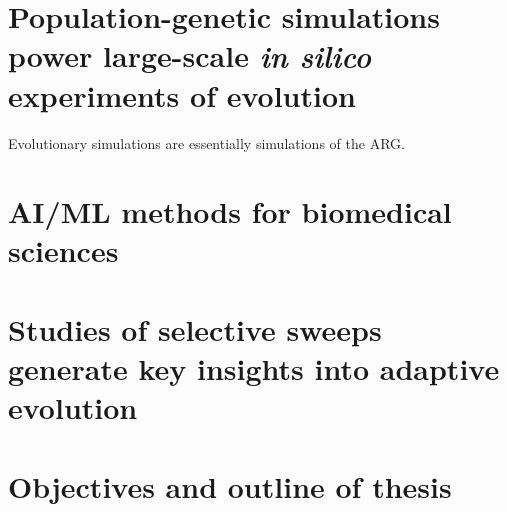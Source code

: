 \section{Population-genetic simulations power large-scale \textit{in silico} experiments of evolution} \label{intro-sim}

Evolutionary simulations are essentially simulations of the \ac{ARG}.




\section{\ac{AI}/\ac{ML} methods for biomedical sciences}

\section{Studies of selective sweeps generate key insights into adaptive evolution}

\section{Objectives and outline of thesis}
